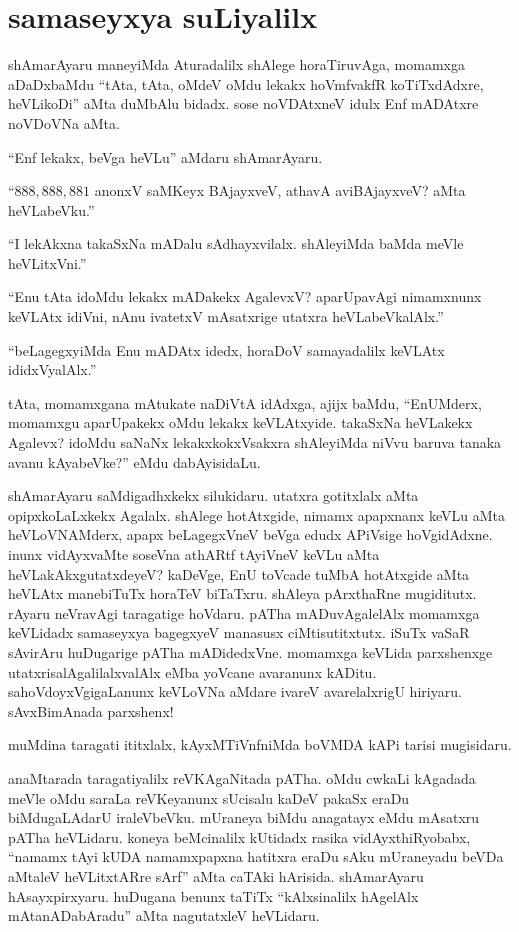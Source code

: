 \chapter{samaseyxya suLiyalilx}\label{chap16}

shAmarAyaru maneyiMda Aturadalilx shAlege horaTiruvAga, momamxga aDaDxbaMdu ``tAta, tAta, oMdeV oMdu lekakx hoVmfvakfR koTiTxdAdxre, heVLikoDi'' aMta duMbAlu bidadx. sose noVDAtxneV idulx Enf mADAtxre noVDoVNa aMta.

``Enf lekakx, beVga heVLu'' aMdaru shAmarAyaru.

``$888,888,881$ anonxV saMKeyx BAjayxveV, athavA aviBAjayxveV? aMta heVLabeVku.''

``I lekAkxna takaSxNa mADalu sAdhayxvilalx. shAleyiMda baMda meVle heVLitxVni.''

``Enu tAta idoMdu lekakx mADakekx AgalevxV? aparUpavAgi nimamxnunx keVLAtx idiVni, nAnu ivatetxV mAsatxrige utatxra heVLabeVkalAlx.''

``beLagegxyiMda Enu mADAtx idedx, horaDoV samayadalilx keVLAtx ididxVyalAlx.''

tAta, momamxgana mAtukate naDiVtA idAdxga, ajijx baMdu, ``EnUMderx, momamxgu aparUpakekx oMdu lekakx keVLAtxyide. takaSxNa heVLakekx Agalevx? idoMdu saNaNx lekakxkokxVsakxra shAleyiMda niVvu baruva tanaka avanu kAyabeVke?'' eMdu dabAyisidaLu.

shAmarAyaru saMdigadhxkekx silukidaru. utatxra gotitxlalx aMta opipxkoLaLxkekx Agalalx. shAlege hotAtxgide, nimamx apapxnanx keVLu aMta heVLoVNAMderx, apapx beLagegxVneV beVga edudx APiVsige hoVgidAdxne. inunx vidAyxvaMte soseVna athARtf tAyiVneV keVLu aMta heVLakAkxgutatxdeyeV? kaDeVge, EnU toVcade tuMbA hotAtxgide aMta heVLAtx manebiTuTx horaTeV biTaTxru. shAleya pArxthaRne mugiditutx. rAyaru neVravAgi taragatige hoVdaru. pATha mADuvAgalelAlx momamxga keVLidadx samaseyxya bagegxyeV manasusx ciMtisutitxtutx. iSuTx vaSaR sAvirAru huDugarige pATha mADidedxVne. momamxga keVLida parxshenxge utatxrisalAgalilalxvalAlx eMba yoVcane avaranunx kADitu. sahoVdoyxVgigaLanunx keVLoVNa aMdare ivareV avarelalxrigU hiriyaru. sAvxBimAnada parxshenx!

muMdina taragati ititxlalx, kAyxMTiVnfniMda boVMDA kAPi tarisi mugisidaru. 

anaMtarada taragatiyalilx reVKAgaNitada pATha. oMdu cwkaLi kAgadada meVle oMdu saraLa reVKeyanunx sUcisalu kaDeV pakaSx eraDu biMdugaLAdarU iraleVbeVku. mUraneya biMdu anagatayx eMdu mAsatxru pATha heVLidaru. koneya beMcinalilx kUtidadx rasika vidAyxthiRyobabx, ``namamx tAyi kUDA namamxpapxna hatitxra eraDu sAku mUraneyadu beVDa aMtaleV heVLitxtARre sArf'' aMta caTAki hArisida. shAmarAyaru hAsayxpirxyaru. huDugana benunx taTiTx ``kAlxsinalilx hAgelAlx mAtanADabAradu'' aMta nagutatxleV heVLidaru.

